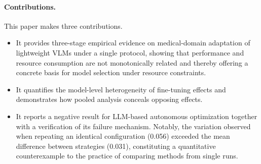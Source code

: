 \paragraph{Contributions.} This paper makes three contributions.
\begin{itemize}
\itemsep2pt
\item It provides three-stage empirical evidence on medical-domain adaptation of
lightweight VLMs under a single protocol, showing that performance and resource
consumption are not monotonically related and thereby offering a concrete basis
for model selection under resource constraints.
\item It quantifies the model-level heterogeneity of fine-tuning effects and
demonstrates how pooled analysis conceals opposing effects.
\item It reports a negative result for LLM-based autonomous optimization together
with a verification of its failure mechanism. Notably, the variation observed
when repeating an identical configuration (0.056) exceeded the mean difference
between strategies (0.031), constituting a quantitative counterexample to the
practice of comparing methods from single runs.
\end{itemize}
